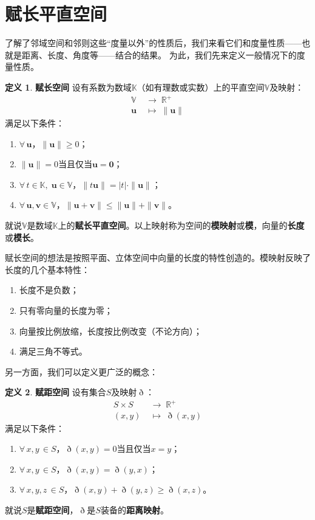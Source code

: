 \documentclass[12pt,UTF8]{ctexbook}
\theoremstyle{definition}
\newtheorem{df}{定义}[section]
\theoremstyle{plain}
\begin{document}
\section{赋长平直空间}

了解了邻域空间和邻则这些“度量以外”的性质后，我们来看它们和度量性质——也就是距离、长度、角度等——结合的结果。
为此，我们先来定义一般情况下的度量性质。

\begin{df}{\textbf{赋长空间}}
    设有系数为数域$\mathbb{K}$（如有理数或实数）上的平直空间$\mathbb{V}$及映射：
    \begin{align*}
        \mathbb{V} \;&\rightarrow \;\mathbb{R}^+ \\
        \mathbf{u} \;&\mapsto \;\| \mathbf{u} \|
    \end{align*}
    满足以下条件：
    \begin{enumerate}
        \item $\forall \, \mathbf{u}$，$\|\mathbf{u}\| \geqslant 0$；
        \item $\| \mathbf{u} \| = 0$当且仅当$\mathbf{u} = \mathbf{0}$；
        \item $\forall \, t \in \mathbb{K}, \; \mathbf{u}\in \mathbb{V}$，$\| t\mathbf{u}\| = |t|\cdot \|\mathbf{u}\|$；
        \item $\forall \, \mathbf{u}, \mathbf{v} \in \mathbb{V}$，$\|\mathbf{u} + \mathbf{v}\| \leqslant \|\mathbf{u}\| + \|\mathbf{v}\|$。
    \end{enumerate}
    就说$\mathbb{V}$是数域$\mathbb{K}$上的\textbf{赋长平直空间}。以上映射称为空间的\textbf{模映射}或\textbf{模}，向量的\textbf{长度}或\textbf{模长}。
\end{df}

赋长空间的想法是按照平面、立体空间中向量的长度的特性创造的。模映射反映了长度的几个基本特性：
\begin{enumerate}
    \item 长度不是负数；
    \item 只有零向量的长度为零；
    \item 向量按比例放缩，长度按比例改变（不论方向）；
    \item 满足三角不等式。
\end{enumerate}

另一方面，我们可以定义更广泛的概念：
\begin{df}{\textbf{赋距空间}}
    设有集合$S$及映射$\eth$：
    \begin{align*}
        S\times S \;&\rightarrow \; \mathbb{R}^+ \\
        (x, y) \;&\mapsto \; \eth(x, y)
    \end{align*}
    满足以下条件：
    \begin{enumerate}
        \item $\forall \, x, y\, \in S$，$\eth(x, y) = 0$当且仅当$x = y$；
        \item $\forall \, x, y\, \in S$，$\eth(x, y) = \eth(y, x)$；
        \item $\forall \, x, y, z\, \in S$，$\eth(x, y) + \eth(y, z) \geqslant \eth (x, z)$。
    \end{enumerate}
    就说$S$是\textbf{赋距空间}，$\eth$是$S$装备的\textbf{距离映射}。
\end{df}
\end{document}
